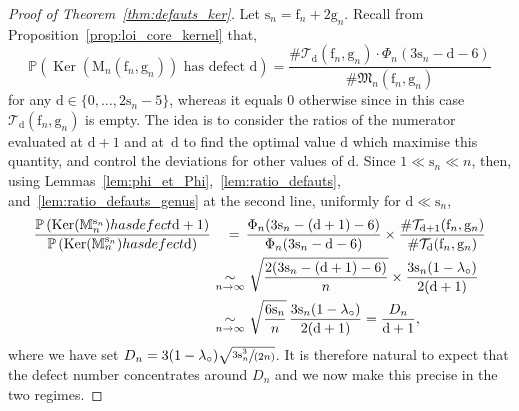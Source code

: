 \documentclass[11pt]{article}
\theoremstyle{plain}
\theoremstyle{definition}
\theoremstyle{remark}
\renewcommand{\P}{\mathbb{P}}
\newcommand{\Map}{\mathrm{M}}
\newcommand{\Mapb}{\mathbb{M}}
\newcommand{\face}{\mathrm{f}}
\newcommand{\defect}{\mathrm{d}}
\newcommand{\gen}{\mathrm{g}}
\newcommand{\spar}{\mathrm{s}}
\DeclareMathOperator{\Ker}{Ker}
\newcommand{\equi}[1][n]{\,\mathop{\sim}^{}_{#1 \to \infty}\,}
\begin{document}
\begin{proof}[Proof of Theorem~\ref{thm:defauts_ker}]
Let $\spar_n = \face_n+2\gen_n$.
Recall from Proposition~\ref{prop:loi_core_kernel} that,
\[
\P\left(\Ker(\Map_n(\face_n,\gen_n)) \textrm{ has defect } \defect\right)
= \frac{\# \mathcal{T}_\defect(\face_n,\gen_n) \cdot \Phi_{n}(3\spar_n-\defect-6 )}{\# \mathfrak{M}_n(\face_n,\gen_n)}
\]
for any $\defect \in\{0, \dots, 2\spar_n-5\}$, whereas it equals $0$ otherwise since in this case $\mathcal{T}_\defect(\face_n,\gen_n)$ is empty.
The idea is to consider the ratios of the numerator evaluated at $\defect+1$ and at~$\defect$ to find the optimal value $\defect$ which maximise this quantity, and control the deviations for other values of $\defect$.
Since $ 1 \ll \spar_{n} \ll n$, then, using Lemmas~\ref{lem:phi_et_Phi},~\ref{lem:ratio_defauts}, and~\ref{lem:ratio_defauts_genus} at the second line, uniformly for $ \defect \ll \spar_{n}$,
\begin{align}
\frac{\P\left(\Ker(\Mapb_n^{\spar_n}) \textrm{ has defect } \defect+1\right)}{\P\left(\Ker(\Mapb_n^{\spar_n}) \textrm{ has defect } \defect\right)}
&\quad=\, \frac{\Phi_{n}(3\spar_n-(\defect+1)-6 )}{\Phi_{n}(3\spar_n-\defect-6 )} \times \frac{ \# \mathcal{T}_{ \defect +1}(\face_n,\gen_n)}{{ \# \mathcal{T}_{ \defect}(\face_n,\gen_n)}}
\notag\\
&\equi \sqrt{\frac{2(3\spar_n - (\defect+1) - 6)}{n}} \times \frac{3 \spar_n(1-\lambda_{\circ})}{2 (\defect+1)}
\notag\\
&\equi \sqrt{\frac{6\spar_n}{n}}\, \frac{3 \spar_n(1-\lambda_{\circ})}{2 (\defect+1)}
= \frac{D_n}{\defect+1}, \label{eq:ratio_estimee}
\end{align}
where we have set $D_n = 3 (1-\lambda_{\circ}) \sqrt{\sfrac{3\spar_n^3}{(2n)}}$. It is therefore natural to expect that the defect number concentrates around $D_n$ and we now make this precise in the two regimes.


\end{proof}
\end{document}
